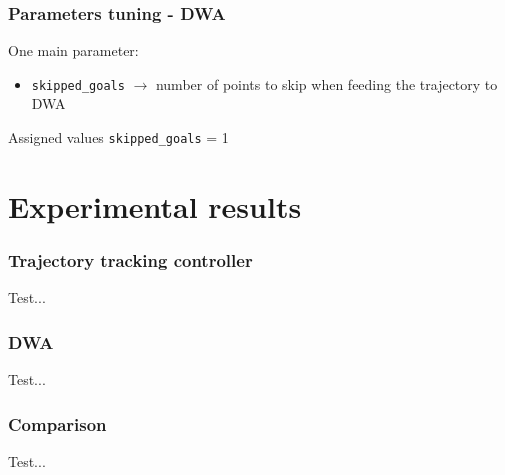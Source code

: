 \documentclass{beamer}
\begin{document}

\begin{frame}
\frametitle{Parameters tuning - DWA}

One main parameter:
\begin{itemize}
 \item \texttt{skipped\_goals} $\rightarrow$ number of points to skip when feeding the trajectory to DWA
\end{itemize}

\vspace{2em}

\begin{block}{Assigned values}
\centering
\texttt{skipped\_goals} = 1
\end{block}

\end{frame}




\section{Experimental results}


\begin{frame}
\frametitle{Trajectory tracking controller}

Test...

\end{frame}


\begin{frame}
\frametitle{DWA}

Test...

\end{frame}


\begin{frame}
\frametitle{Comparison}

Test...

\end{frame}
\end{document}
